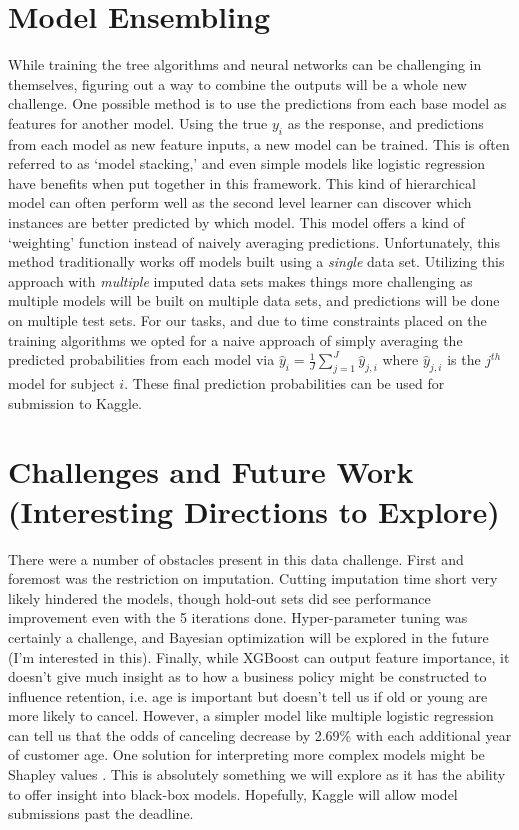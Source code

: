 \documentclass[11pt]{article}
\theoremstyle{remark}
\theoremstyle{definition}
\begin{document}
\section{Model Ensembling}
While training the tree algorithms and neural networks can be challenging in themselves, figuring out a way to combine the outputs will be a whole new challenge. One possible method is to use the predictions from each base model as features for another model. Using the true $y_i$ as the response, and predictions from each model as new feature inputs, a new model can be trained. This is often referred to as `model stacking,' and even simple models like logistic regression have benefits when put together in this framework. This kind of hierarchical model can often perform well as the second level learner can discover which instances are better predicted by which model. This model offers a kind of `weighting' function instead of naively averaging predictions. Unfortunately, this method traditionally works off models built using a \textit{single} data set. Utilizing this approach with \textit{multiple} imputed data sets makes things more challenging as multiple models will be built on multiple data sets, and predictions will be done on multiple test sets. For our tasks, and due to time constraints placed on the training algorithms we opted for a naive approach of simply averaging the predicted probabilities from each model via $\hat{y}_i = \frac{1}{J} \sum\limits_{j=1}^{J} \hat{y}_{j, i}$ where $\hat{y}_{j, i}$ is the $j^{th}$ model for subject $i$. These final prediction probabilities can be used for submission to Kaggle.
\section{Challenges and Future Work (Interesting Directions to Explore)}
There were a number of obstacles present in this data challenge. First and foremost was the restriction on imputation. Cutting imputation time short very likely hindered the models, though hold-out sets did see performance improvement even with the 5 iterations done. Hyper-parameter tuning was certainly a challenge, and Bayesian optimization will be explored in the future (I'm interested in this). Finally, while XGBoost can output feature importance, it doesn't give much insight as to how a business policy might be constructed to influence retention, i.e. age is important but doesn't tell us if old or young are more likely to cancel. However, a simpler model like multiple logistic regression can tell us that the odds of canceling decrease by 2.69\% with each additional year of customer age. One solution for interpreting more complex models might be Shapley values \citep{lundberg2017}. This is absolutely something we will explore as it has the ability to offer insight into black-box models. Hopefully, Kaggle will allow model submissions past the deadline.
\newpage

\end{document}

